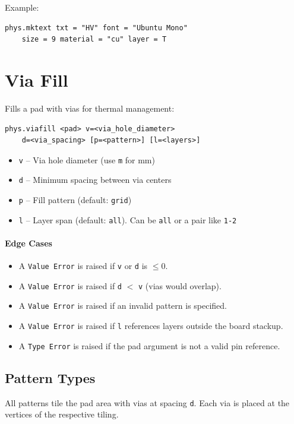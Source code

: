 Example:
\begin{verbatim}
phys.mktext txt = "HV" font = "Ubuntu Mono" 
    size = 9 material = "cu" layer = T
\end{verbatim}

\section{Via Fill}
Fills a pad with vias for thermal management:
\begin{verbatim}
phys.viafill <pad> v=<via_hole_diameter> 
    d=<via_spacing> [p=<pattern>] [l=<layers>]
\end{verbatim}
\begin{itemize}
\item \texttt{v} -- Via hole diameter (use \texttt{m} for mm)
\item \texttt{d} -- Minimum spacing between via centers
\item \texttt{p} -- Fill pattern (default: \texttt{grid})
\item \texttt{l} -- Layer span (default: \texttt{all}). Can be \texttt{all} or a pair like \texttt{1-2}
\end{itemize}

\paragraph{Edge Cases}
\begin{itemize}
\item A \texttt{Value Error} is raised if \texttt{v} or \texttt{d} is $\leq 0$.
\item A \texttt{Value Error} is raised if \texttt{d} $<$ \texttt{v} (vias would overlap).
\item A \texttt{Value Error} is raised if an invalid pattern is specified.
\item A \texttt{Value Error} is raised if \texttt{l} references layers outside the board stackup.
\item A \texttt{Type Error} is raised if the pad argument is not a valid pin reference.
\end{itemize}

\subsection{Pattern Types}

All patterns tile the pad area with vias at spacing \texttt{d}. Each via is placed at the vertices of the respective tiling.

